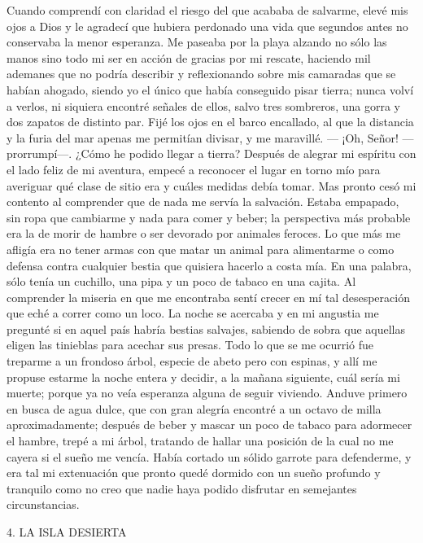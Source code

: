 \documentclass{novela}
\begin{document}
    Cuando comprendí con claridad el riesgo del que acababa de salvarme, elevé mis ojos a Dios y le agradecí que hubiera perdonado una vida que segundos antes no conservaba la menor esperanza. Me paseaba por la playa alzando no sólo las manos sino todo mi ser en acción de gracias por mi rescate, haciendo mil ademanes que no podría describir y reflexionando sobre mis camaradas que se habían ahogado, siendo yo el único que había conseguido pisar tierra; nunca volví a verlos, ni siquiera encontré señales de ellos, salvo tres sombreros, una gorra y dos zapatos de distinto par.
    Fijé los ojos en el barco encallado, al que la distancia y la furia del mar apenas me permitían divisar, y me maravillé.
    — ¡Oh, Señor! —prorrumpí—. ¿Cómo he podido llegar a tierra?
    Después de alegrar mi espíritu con el lado feliz de mi aventura, empecé a reconocer el lugar en torno mío para averiguar qué clase de sitio era y cuáles medidas debía tomar. Mas pronto cesó mi contento al comprender que de nada me servía la salvación. Estaba empapado, sin ropa que cambiarme y nada para comer y beber; la perspectiva más probable era la de morir de hambre o ser devorado por animales feroces. Lo que más me afligía era no tener armas con que matar un animal para alimentarme o como defensa contra cualquier bestia que quisiera hacerlo a costa mía. En una palabra, sólo tenía un cuchillo, una pipa y un poco de tabaco en una cajita. Al comprender la miseria en que me encontraba sentí crecer en mí tal desesperación que eché a correr como un loco. La noche se acercaba y en mi angustia me pregunté si en aquel país habría bestias salvajes, sabiendo de sobra que aquellas eligen las tinieblas para acechar sus presas. Todo lo que se me ocurrió fue treparme a un frondoso árbol, especie de abeto pero con espinas, y allí me propuse estarme la noche entera y decidir, a la mañana siguiente, cuál sería mi muerte; porque ya no veía esperanza alguna de seguir viviendo.
    Anduve primero en busca de agua dulce, que con gran alegría encontré a un octavo de milla aproximadamente; después de beber y mascar un poco de tabaco para adormecer el hambre, trepé a mi árbol, tratando de hallar una posición de la cual no me cayera si el sueño me vencía. Había cortado un sólido garrote para defenderme, y era tal mi extenuación que pronto quedé dormido con un sueño profundo y tranquilo como no creo que nadie haya podido disfrutar en semejantes circunstancias.





    4. LA ISLA DESIERTA
\end{document}
